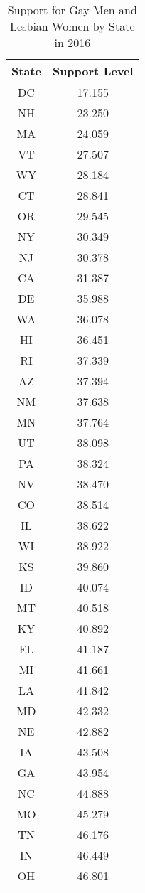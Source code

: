 
\begin{longtable}{|c|c|} %
\caption{Support for Gay Men and Lesbian Women by State in 2016}
\label{tab: pop_support} 
\hline
State & Support Level\\
\hline
DC & 17.155\\
\hline
NH & 23.250\\
\hline
MA & 24.059\\
\hline
VT & 27.507\\
\hline
WY & 28.184\\
\hline
CT & 28.841\\
\hline
OR & 29.545\\
\hline
NY & 30.349\\
\hline
NJ & 30.378\\
\hline
CA & 31.387\\
\hline
DE & 35.988\\
\hline
WA & 36.078\\
\hline
HI & 36.451\\
\hline
RI & 37.339\\
\hline
AZ & 37.394\\
\hline
NM & 37.638\\
\hline
MN & 37.764\\
\hline
UT & 38.098\\
\hline
PA & 38.324\\
\hline
NV & 38.470\\
\hline
CO & 38.514\\
\hline
IL & 38.622\\
\hline
WI & 38.922\\
\hline
KS & 39.860\\
\hline
ID & 40.074\\
\hline
MT & 40.518\\
\hline
KY & 40.892\\
\hline
FL & 41.187\\
\hline
MI & 41.661\\
\hline
LA & 41.842\\
\hline
MD & 42.332\\
\hline
NE & 42.882\\
\hline
IA & 43.508\\
\hline
GA & 43.954\\
\hline
NC & 44.888\\
\hline
MO & 45.279\\
\hline
TN & 46.176\\
\hline
IN & 46.449\\
\hline
OH & 46.801\\

\end{longtable}
